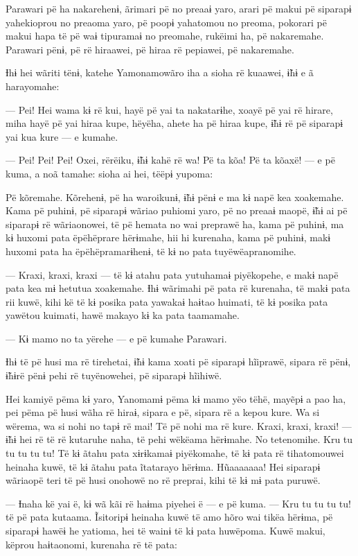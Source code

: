 Parawari pë ha nakarehenɨ, ãrimari pë no preaaɨ yaro, arari pë makui pë
siparapɨ yahekioprou no preaoma yaro, pë poopɨ yahatomou no preoma,
pokorari pë makui hapa të pë waɨ tipuramaɨ no preomahe, rukëimi ha, pë
nakaremahe. Parawari pënɨ, pë rë hiraawei, pë hiraa rë pepiawei, pë
nakaremahe. 

Ɨhɨ hei wãriti tënɨ, katehe Yamonamowãro iha a sioha rë kuaawei, ɨ̃hɨ e ã
harayomahe: 

--- Pei! Hei wama kɨ rë kui, hayë pë yai ta nakatarɨhe, xoayë pë yai rë
hirare, miha hayë pë yai hiraa kupe, hëyëha, ahete ha pë hiraa kupe, ɨ̃hɨ
rë pë siparapɨ yai kua kure --- e kumahe. 

--- Pei! Pei! Pei! Oxei, rërëiku, ɨ̃hɨ kahë rë wa! Pë ta kõa! Pë ta
kõaxë! --- e pë kuma, a noã tamahe: sioha ai hei, tëëpɨ yupoma: 

Pë kõremahe. Kõrehenɨ, pë ha waroikunɨ, ɨ̃hɨ pënɨ e ma kɨ napë kea
xoakemahe. Kama pë puhinɨ, pë siparapɨ wãriao puhiomi yaro, pë no preaaɨ
maopë, ɨ̃hɨ ai pë siparapɨ rë wãriaonowei, të pë hemata no wai preprawë
ha, kama pë puhinɨ, ma kɨ huxomi pata ëpëhëprare hërɨmahe, hii hi
kurenaha, kama pë puhinɨ, makɨ huxomi pata ha ëpëhëpramarɨhenɨ, të kɨ no
pata tuyëwëapranomihe. 

--- Kraxi, kraxi, kraxi --- të kɨ atahu pata yutuhamaɨ piyëkopehe, e
makɨ napë pata kea mɨ hetutua xoakemahe. Ɨhɨ wãrimahi pë pata rë
kurenaha, të makɨ pata rii kuwë, kihi kë të kɨ posika pata yawakaɨ
haɨtao huimati, të kɨ posika pata yawëtou kuimati, hawë makayo kɨ ka
pata taamamahe. 

--- Kɨ mamo no ta yërehe --- e pë kumahe Parawari. 

Ɨhɨ të pë husi ma rë tirehetai, ɨ̃hɨ kama xoati pë siparapɨ hĩiprawë,
sipara rë pënɨ, ɨ̃hɨrë pënɨ pehi rë tuyënowehei, pë siparapɨ hĩihiwë. 

Hei kamiyë pëma kɨ yaro, Yanomamɨ pëma kɨ mamo yëo tëhë, mayẽpɨ a pao
ha, pei pëma pë husi wãha rë hiraɨ, sipara e pë, sipara rë a kepou kure.
Wa si wërema, wa si nohi no tapɨ rë mai! Të pë nohi ma rë kure. Kraxi,
kraxi, kraxi! --- ɨ̃hɨ hei rë të rë kutaruhe naha, të pehi wëkëama
hërɨmahe. No tetenomihe. Kru tu tu tu tu tu! Të kɨ ãtahu pata xɨrɨkamaɨ
piyëkomahe, të kɨ pata rë tihatomouwei heinaha kuwë, të kɨ ãtahu pata
ĩtatarayo hërɨma. Hũaaaaaaa! Hei siparapɨ wãriaopë teri të pë husi
onohowë no rë preprai, kihi të kɨ mɨ pata puruwë. 

--- Ɨnaha kë yai ë, kɨ wã kãi rë haɨma piyehei ë --- e pë kuma. --- Kru
tu tu tu tu! të pë pata kutaama. Ĩsitoripɨ heinaha kuwë të amo hõro wai
tikëa hërɨma, pë siparapɨ hawëɨ he yatioma, hei të wainɨ të kɨ pata
huwëpoma. Kuwë makui, këprou haɨtaonomi, kurenaha rë të pata:

